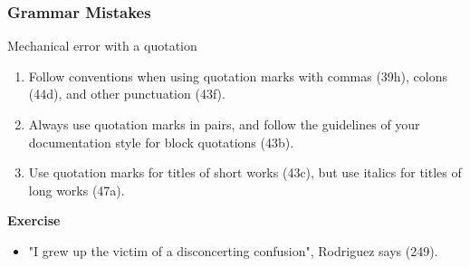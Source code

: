 \documentclass{beamer}
\begin{document}
\begin{frame}
\frametitle{Grammar Mistakes}
\begin{block}{Mechanical error with a quotation}
\begin{enumerate}
\item Follow conventions when using quotation marks with commas (39h), colons (44d), and other punctuation (43f). 
\item Always use quotation marks in pairs, and follow the guidelines of your documentation style for block quotations (43b). 
\item Use quotation marks for titles of short works (43c), but use italics for titles of long works (47a).
\end{enumerate}
\textbf{Exercise}
\begin{itemize}
\item "I grew up the victim of a disconcerting confusion", Rodriguez says (249).
\end{itemize}
\end{block}
\end{frame}
\end{document}

